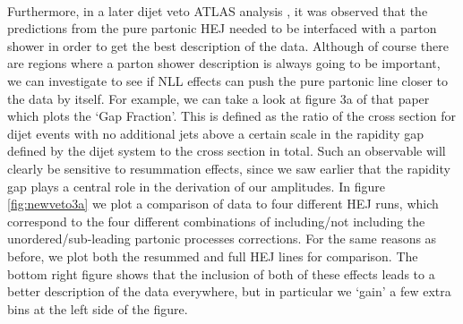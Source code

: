 \\
Furthermore, in a later dijet veto ATLAS analysis \cite{Aad2014}, it was observed that the predictions from the pure partonic HEJ needed to be interfaced with a parton shower in order to get the best description of the data. Although of course there are regions where a parton shower description is always going to be important, we can investigate to see if NLL effects can push the pure partonic line closer to the data by itself. For example, we can take a look at figure 3a of that paper which plots the `Gap Fraction'. This is defined as the ratio of the cross section for dijet events with no additional jets above a certain scale in the rapidity gap defined by the dijet system to the cross section in total. Such an observable will clearly be sensitive to resummation effects, since we saw earlier that the rapidity gap plays a central role in the derivation of our amplitudes. In figure \ref{fig:newveto3a} we plot a comparison of data to four different HEJ runs, which correspond to the four different combinations of including/not including the unordered/sub-leading partonic processes corrections. For the same reasons as before, we plot both the resummed and full HEJ lines for comparison. The bottom right figure shows that the inclusion of both of these effects leads to a better description of the data everywhere, but in particular we `gain' a few extra bins at the left side of the figure. 

